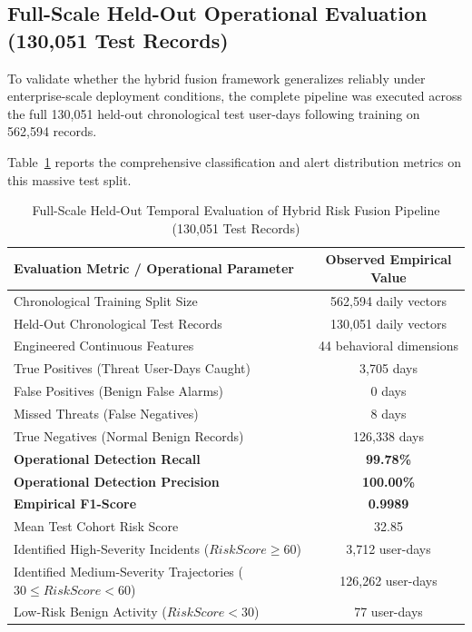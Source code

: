 \documentclass[conference]{IEEEtran}
\begin{document}
\subsection{Full-Scale Held-Out Operational Evaluation (130,051 Test Records)}
\label{subsec:full_scale_test}
To validate whether the hybrid fusion framework generalizes reliably under enterprise-scale deployment conditions, the complete pipeline was executed across the full 130,051 held-out chronological test user-days following training on 562,594 records. 

Table~\ref{tab:full_scale_test} reports the comprehensive classification and alert distribution metrics on this massive test split.

\begin{table}[htbp]
\caption{Full-Scale Held-Out Temporal Evaluation of Hybrid Risk Fusion Pipeline (130,051 Test Records)}
\label{tab:full_scale_test}
\centering
\begin{tabular}{lc}
\toprule
\textbf{Evaluation Metric / Operational Parameter} & \textbf{Observed Empirical Value} \\
\midrule
Chronological Training Split Size & 562,594 daily vectors \\
Held-Out Chronological Test Records & 130,051 daily vectors \\
Engineered Continuous Features & 44 behavioral dimensions \\
True Positives (Threat User-Days Caught) & 3,705 days \\
False Positives (Benign False Alarms) & 0 days \\
Missed Threats (False Negatives) & 8 days \\
True Negatives (Normal Benign Records) & 126,338 days \\
\midrule
\textbf{Operational Detection Recall} & \textbf{99.78\%} \\
\textbf{Operational Detection Precision} & \textbf{100.00\%} \\
\textbf{Empirical F1-Score} & \textbf{0.9989} \\
Mean Test Cohort Risk Score & 32.85 \\
Identified High-Severity Incidents ($RiskScore \ge 60$) & 3,712 user-days \\
Identified Medium-Severity Trajectories ($30 \le RiskScore < 60$) & 126,262 user-days \\
Low-Risk Benign Activity ($RiskScore < 30$) & 77 user-days \\
\bottomrule
\end{tabular}
\end{table}
\end{document}
